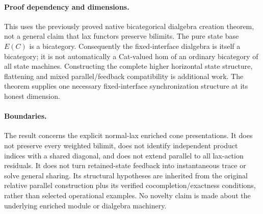 \documentclass{article}
\begin{document}
\paragraph{Proof dependency and dimensions.} This uses the previously proved native bicategorical dialgebra creation theorem, not a general claim that lax functors preserve bilimits. The pure state base $E(C)$ is a bicategory. Consequently the fixed-interface dialgebra is itself a bicategory; it is not automatically a Cat-valued hom of an ordinary bicategory of all state machines. Constructing the complete higher horizontal state structure, flattening and mixed parallel/feedback compatibility is additional work. The theorem supplies one necessary fixed-interface synchronization structure at its honest dimension.

\paragraph{Boundaries.} The result concerns the explicit normal-lax enriched cone presentations. It does not preserve every weighted bilimit, does not identify independent product indices with a shared diagonal, and does not extend parallel to all lax-action residuals. It does not turn retained-state feedback into instantaneous trace or solve general sharing. Its structural hypotheses are inherited from the original relative parallel construction plus its verified cocompletion/exactness conditions, rather than selected operational examples. No novelty claim is made about the underlying enriched module or dialgebra machinery.
\end{document}
